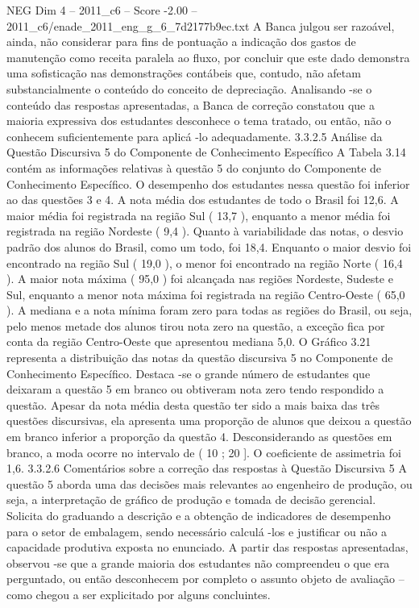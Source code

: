\begin{textsample}{NEG Dim 4 – 2011\_c6 – Score -2.00 – 2011\_c6/enade\_2011\_eng\_g\_6\_7d2177b9ec.txt}
A Banca julgou ser razoável, ainda, não considerar para fins de pontuação a indicação dos gastos de manutenção como receita paralela ao fluxo, por concluir que este dado demonstra uma sofisticação nas demonstrações contábeis que, contudo, não afetam substancialmente o conteúdo do conceito de depreciação.
Analisando -se o conteúdo das respostas apresentadas, a Banca de correção constatou que a maioria expressiva dos estudantes desconhece o tema tratado, ou então, não o conhecem suficientemente para aplicá -lo adequadamente. 3.3.2.5 Análise da Questão Discursiva 5 do Componente de Conhecimento Específico A Tabela 3.14 contém as informações relativas à questão 5 do conjunto do Componente de Conhecimento Específico.
O desempenho dos estudantes nessa questão foi inferior ao das questões 3 e 4.
A nota média dos estudantes de todo o Brasil foi 12,6.
A maior média foi registrada na região Sul ( 13,7 ), enquanto a menor média foi registrada na região Nordeste ( 9,4 ).
Quanto à variabilidade das notas, o desvio padrão dos alunos do Brasil, como um todo, foi 18,4.
Enquanto o maior desvio foi encontrado na região Sul ( 19,0 ), o menor foi encontrado na região Norte ( 16,4 ).
A maior nota máxima ( 95,0 ) foi alcançada nas regiões Nordeste, Sudeste e Sul, enquanto a menor nota máxima foi registrada na região Centro-Oeste ( 65,0 ).
A mediana e a nota mínima foram zero para todas as regiões do Brasil, ou seja, pelo menos metade dos alunos tirou nota zero na questão, a exceção fica por conta da região Centro-Oeste que apresentou mediana 5,0.
O Gráfico 3.21 representa a distribuição das notas da questão discursiva 5 no Componente de Conhecimento Específico.
Destaca -se o grande número de estudantes que deixaram a questão 5 em branco ou obtiveram nota zero tendo respondido a questão.
Apesar da nota média desta questão ter sido a mais baixa das três questões discursivas, ela apresenta uma proporção de alunos que deixou a questão em branco inferior a proporção da questão 4.
Desconsiderando as questões em branco, a moda ocorre no intervalo de ( 10 ; 20 ].
O coeficiente de assimetria foi 1,6. 3.3.2.6 Comentários sobre a correção das respostas à Questão Discursiva 5 A questão 5 aborda uma das decisões mais relevantes ao engenheiro de produção, ou seja, a interpretação de gráfico de produção e tomada de decisão gerencial.
Solicita do graduando a descrição e a obtenção de indicadores de desempenho para o setor de embalagem, sendo necessário calculá -los e justificar ou não a capacidade produtiva exposta no enunciado.
A partir das respostas apresentadas, observou -se que a grande maioria dos estudantes não compreendeu o que era perguntado, ou então desconhecem por completo o assunto objeto de avaliação – como chegou a ser explicitado por alguns concluintes.

\end{textsample}
